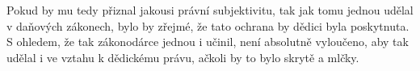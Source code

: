 \documentclass{article}
\begin{document}
Pokud by mu tedy přiznal jakousi právní subjektivitu, tak jak tomu jednou udělal v daňových zákonech, bylo by zřejmé, že tato ochrana by dědici byla poskytnuta. S ohledem, že tak zákonodárce jednou i učinil, není absolutně vyloučeno, aby tak udělal i ve vztahu k dědickému právu, ačkoli by to bylo skrytě a mlčky.\\










\end{document}
